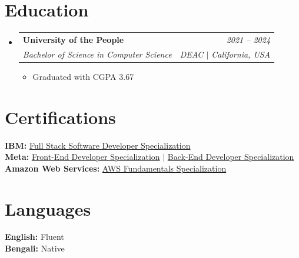 \documentclass[letterpaper,11pt]{article}
\makeatletter
\newcommand{\resumeItem}[1]{
  \item\small{#1 \vspace{-1pt}}
}
\newcommand{\resumeSubheading}[4]{
  \vspace{-1pt}\item
    \begin{tabular*}{0.97\textwidth}[t]{l@{\extracolsep{\fill}}r}
      \textbf{#1} & \textit{\small #2} \\
      \textit{\small#3} & \textit{\small #4} \\
    \end{tabular*}\vspace{-6pt}
}
\newcommand{\resumeSubHeadingListStart}{\begin{itemize}[leftmargin=0.15in, label={}]}
\newcommand{\resumeSubHeadingListEnd}{\end{itemize}}
\newcommand{\resumeItemListStart}{\begin{itemize}[itemsep=1pt]}
\newcommand{\resumeItemListEnd}{\end{itemize}\vspace{-5pt}}
\makeatother
\begin{document}
\section{Education}
  \resumeSubHeadingListStart
    \resumeSubheading
      {University of the People}{2021 -- 2024}
      {Bachelor of Science in Computer Science}{DEAC $|$ California, USA}
      \resumeItemListStart
        \resumeItem{Graduated with CGPA 3.67}
      \resumeItemListEnd
  \resumeSubHeadingListEnd

\section{Certifications}
  \resumeSubHeadingListStart
    \small{\item{
      \textbf{IBM:}{ \href{https://www.coursera.org/account/accomplishments/specialization/5SFM8DFYF42P}{Full Stack Software Developer Specialization}} \\[2pt]
      \textbf{Meta:}{ \href{https://www.coursera.org/account/accomplishments/specialization/WV4TQ6TLE7Y6}{Front-End Developer Specialization} $|$ \href{https://www.coursera.org/account/accomplishments/specialization/NN9JFTR8M3D8}{Back-End Developer Specialization}} \\[2pt]
      \textbf{Amazon Web Services:}{ \href{https://www.coursera.org/account/accomplishments/specialization/790A6Q46ZUY6}{AWS Fundamentals Specialization}}
    }}
  \resumeSubHeadingListEnd

\section{Languages}
  \resumeSubHeadingListStart
    \small{\item{
     \textbf{English:}{ Fluent} \\[2pt]
     \textbf{Bengali:}{ Native}
    }}
  \resumeSubHeadingListEnd
\end{document}

